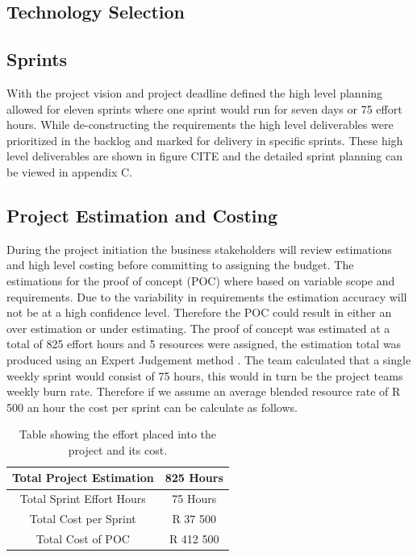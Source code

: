 \documentclass[12pt]{witseiepaper}
\begin{document}
\subsection{Technology Selection}


\subsection{Sprints}
With the project vision and project deadline defined the high level planning allowed for eleven sprints \cite{ExpertJudgement} where one sprint would run for seven days or 75 effort hours. While de-constructing the requirements the high level deliverables were prioritized in the backlog and marked for delivery in specific sprints. These high level deliverables are shown in figure CITE and the detailed sprint planning can be viewed in appendix C.




\subsection{Project Estimation and Costing}
During the project initiation the business stakeholders will review estimations and high level costing before committing to assigning the budget. The estimations for the proof of concept (POC) where based on variable scope and requirements. Due to the variability in requirements the estimation accuracy will not be at a high confidence level. Therefore the POC could result in either an over estimation or under estimating. The proof of concept was estimated at a total of 825 effort hours and 5 resources were assigned, the estimation total was produced using an Expert Judgement method \cite{ExpertJudgement}. The team calculated that a single weekly sprint would consist of 75 hours, this would in turn be the project teams weekly burn rate. Therefore if we assume an average blended resource rate of R 500 an hour the cost per sprint can be calculate as follows.



\begin{table}[htb] \caption{Table showing the effort placed into the project and its cost.} \label{tbl:cost} 
    \begin{center}
  \begin{tabular}
     {|c|c|} %
    \hline Total Project Estimation &825 Hours\\
    \hline Total Sprint Effort Hours &75 Hours\\
    \hline Total Cost per Sprint &R 37 500\\
    \hline Total Cost of POC & R 412 500 \\
    \hline 
  \end{tabular}
      \end{center}
\end{table}
\end{document}
